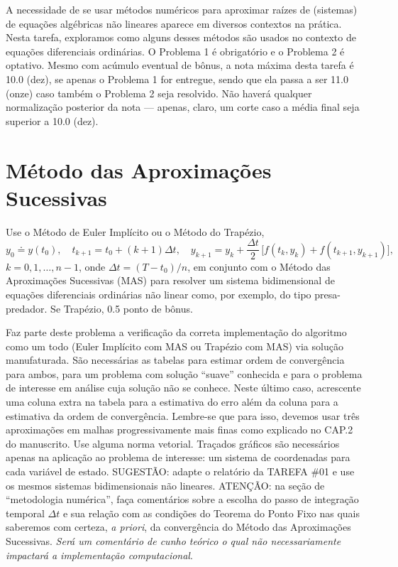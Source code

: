 \documentclass{article}
\begin{document}
\begin{comment}\vspace{2mm}
\noindent {\bf ATENÇÃO:}\, algumas dentre as questões abaixo podem valer nota e/ou serem incluídas em outras atividades durante o quadrimetre. A nota máxima desta tarefa é 10.0 (dez).
\end{comment}

\mbox{}
\vspace{5mm}

A necessidade de se usar métodos numéricos para aproximar raízes de (sistemas) de equações algébricas não lineares aparece em diversos contextos na prática. Nesta tarefa, exploramos como alguns desses métodos são usados no contexto de equações diferenciais ordinárias. 
O Problema 1 é obrigatório e o Problema 2 é optativo. Mesmo com acúmulo eventual de bônus, a nota máxima desta tarefa é 10.0 (dez), se apenas o Problema 1 for entregue, sendo que ela passa a ser 11.0 (onze) caso também o Problema 2 seja resolvido. Não haverá qualquer normalização posterior da nota --- apenas, claro, um corte caso a média final seja superior a 10.0 (dez).

\section{Método das Aproximações Sucessivas}
Use o Método de Euler Implícito ou o Método do Trapézio, 
\[ y_0\doteq y(t_0),\quad t_{k+1}=t_0+(k+1)\Delta t,\quad y_{k+1}=y_k+\frac{\Delta t}{2}\,\Big[f(t_k,y_k)+f(t_{k+1},y_{k+1})\Big], 
\] 
$k=0,1,\ldots , n-1$, onde $\Delta t=(T-t_0)/n$,
em conjunto com o Método das Aproxi\-mações Sucessivas (MAS) para resolver um sistema bidimensional de equações diferenciais ordinárias não linear como, por exemplo, do tipo presa-predador. Se Trapézio, 0.5 ponto de bônus.  

Faz parte deste problema a verificação da correta implementação do algoritmo como um todo (Euler Implícito com MAS ou Trapézio com MAS) via solução manufaturada. São  necessárias as tabelas para estimar ordem de convergência para ambos, para um problema com solução ``suave'' conhecida e para o problema de interesse em análise cuja solução não se conhece. Neste último caso, acrescente uma coluna extra na tabela para a estimativa do erro além da coluna para a estimativa da ordem de convergência. Lembre-se que para isso, devemos usar três aproximações em malhas progressivamente mais finas como explicado no CAP.2 do manuscrito. Use alguma norma vetorial.  Traçados gráficos são necessários apenas na aplicação ao problema de interesse: um sistema de coordenadas para cada variável de estado. SUGESTÃO: adapte o relatório da TAREFA \#01 e use os mesmos sistemas bidimensionais não li\-neares. ATENÇÃO: na seção de ``metodologia numérica'', faça comentários sobre a escolha do passo de integração temporal $\Delta t$ e sua relação com as condições do Teorema do Ponto Fixo nas quais saberemos com certeza, {\it a priori}, da convergência do Método das Aproximações Sucessivas. {\it Será um comentário de cunho teórico o qual não necessariamente impactará a implementação computacional}.
\end{document}
